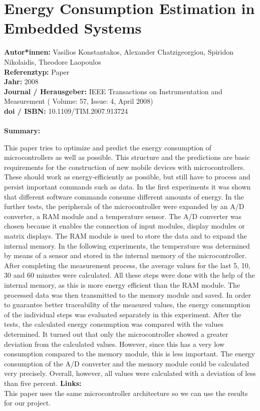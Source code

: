 \documentclass{report}
\begin{document}
{%

{\let\clearpage\relax \chapter{Energy Consumption Estimation in Embedded Systems}}
\noindent
\textbf{Autor*innen:} Vasilios Konstantakos, Alexander Chatzigeorgiou, Spiridon Nikolaidis, Theodore Laopoulos\\
\textbf{Referenztyp:} Paper\\
\textbf{Jahr:}  2008\\
\textbf{Journal / Herausgeber:}  IEEE Transactions on Instrumentation and Measurement ( Volume: 57, Issue: 4, April 2008) \\
\textbf{doi / ISBN:} 10.1109/TIM.2007.913724\\\\
\textbf{Summary:}\\
{\raggedright
This paper tries to optimize and predict the energy consumption of microcontrollers as well as possible. This structure and the predictions are basic requirements for the construction of new mobile devices with microcontrollers. These should work as energy-efficiently as possible, but still have to process and persist important commands such as data. In the first experiments it was shown that different software commands consume different amounts of energy. In the further tests, the peripherals of the microcontroller were expanded by an A/D converter, a RAM module and a temperature sensor. The A/D converter was chosen because it enables the connection of input modules, display modules or matrix displays. The RAM module is used to store the data and to expand the internal memory. In the following experiments, the temperature was determined by means of a sensor and stored in the internal memory of the microcontroller. After completing the measurement process, the average values for the last 5, 10, 30 and 60 minutes were calculated. All these steps were done with the help of the internal memory, as this is more energy efficient than the RAM module. The processed data was then transmitted to the memory module and saved. In order to guarantee better traceability of the measured values, the energy consumption of the individual steps was evaluated separately in this experiment.\linebreak
After the tests, the calculated energy consumption was compared with the values determined. It turned out that only the microcontroller showed a greater deviation from the calculated values. However, since this has a very low consumption compared to the memory module, this is less important. The energy consumption of the A/D converter and the memory module could be calculated very precisely. Overall, however, all values were calculated with a deviation of less than five percent.\linebreak\linebreak
\textbf{Links:}\\
This paper uses the same microcontroller architecture so we can use the results for our project.}
\pagebreak
	
}
\end{document}
